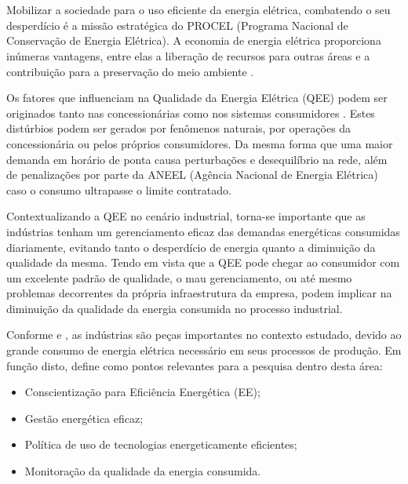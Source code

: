 \cleardoublepage
\pagestyle{fancy}
\setcounter{page}{9}
\chapter{\capum}\label{intro}
\par
Mobilizar a sociedade para o uso eficiente da energia elétrica, combatendo o seu desperdício é a missão estratégica do PROCEL (Programa Nacional de Conservação de Energia Elétrica). A economia de energia elétrica proporciona inúmeras vantagens, entre elas a liberação de recursos para outras áreas e a contribuição para a preservação do meio ambiente \cite{ELE10}.
\par
Os fatores que influenciam na Qualidade da Energia Elétrica (QEE) podem ser originados tanto nas concessionárias como nos sistemas consumidores \cite{MEL08}. Estes distúrbios podem ser gerados por fenômenos naturais, por operações da concessionária ou pelos próprios consumidores. Da mesma forma que uma maior demanda em horário de ponta causa perturbações e desequilíbrio na rede, além de penalizações por parte da ANEEL (Agência Nacional de Energia Elétrica) caso o consumo ultrapasse o limite contratado. 
\par
Contextualizando a QEE no cenário industrial, torna-se importante que as indústrias tenham um gerenciamento eficaz das demandas energéticas consumidas diariamente, evitando tanto o desperdício de energia quanto a diminuição da qualidade da mesma. Tendo em vista que a QEE pode chegar ao consumidor com um excelente padrão de qualidade, o mau gerenciamento, ou até mesmo problemas decorrentes da própria infraestrutura da empresa, podem implicar na diminuição da qualidade da energia consumida no processo industrial. 
\par
Conforme \cite{SIL09} e \cite{SOL04}, as indústrias são peças importantes no contexto estudado, devido ao grande consumo de energia elétrica necessário em seus processos de produção. Em função disto, \cite{SOL04} define como pontos relevantes para a pesquisa dentro desta área:
\begin{itemize}
	\item Conscientização para Eficiência Energética (EE);
	\item Gestão energética eficaz;
	\item Política de uso de tecnologias energeticamente eficientes;
	\item Monitoração da qualidade da energia consumida.
\end{itemize}
